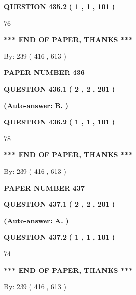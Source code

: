\documentclass[12pt]{article}
\begin{document}
  
{\textbf{\large{QUESTION
435.2 
 ( 1 , 1 , 101 )
}}}

76
   
   
   
   
\vspace{1.0in} 
{\textbf{\large{ *** END OF PAPER, THANKS *** }}} 
   
   
\hspace{1.0in} By: 
 239 ( 416 ,  613 )
   
   
   
   
\newpage 
\setcounter{page}{ 
   436001 } 
   
   
 {\textbf{ \Large{ PAPER NUMBER  436  }}}
   
   
   
   
  
  
{\textbf{\large{QUESTION
436.1 
 ( 2 , 2 , 201 )
}}}
 
 
{\textbf{(Auto-answer:}}
{\textbf{\large{
B.}}}
{\textbf{)}}
 
 
  
  
{\textbf{\large{QUESTION
436.2 
 ( 1 , 1 , 101 )
}}}

78
   
   
   
   
\vspace{1.0in} 
{\textbf{\large{ *** END OF PAPER, THANKS *** }}} 
   
   
\hspace{1.0in} By: 
 239 ( 416 ,  613 )
   
   
   
   
\newpage 
\setcounter{page}{ 
   437001 } 
   
   
 {\textbf{ \Large{ PAPER NUMBER  437  }}}
   
   
   
   
  
  
{\textbf{\large{QUESTION
437.1 
 ( 2 , 2 , 201 )
}}}
 
 
{\textbf{(Auto-answer:}}
{\textbf{\large{
A.}}}
{\textbf{)}}
 
 
  
  
{\textbf{\large{QUESTION
437.2 
 ( 1 , 1 , 101 )
}}}

74
   
   
   
   
\vspace{1.0in} 
{\textbf{\large{ *** END OF PAPER, THANKS *** }}} 
   
   
\hspace{1.0in} By: 
 239 ( 416 ,  613 )
   
   
   
\end{document}
